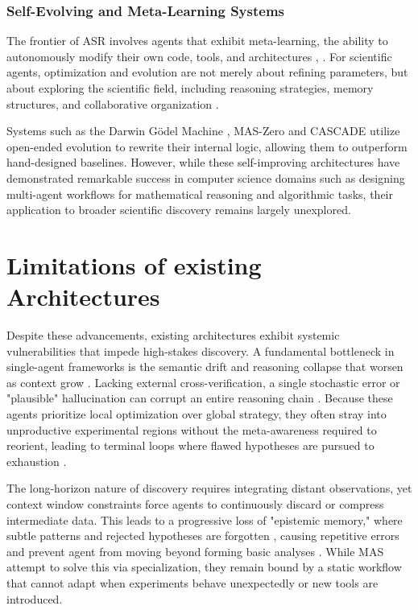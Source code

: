 \documentclass{article}
\begin{document}
\subsubsection{Self-Evolving and Meta-Learning Systems}


The frontier of ASR involves agents that exhibit meta-learning, the ability to autonomously modify their own code, tools, and architectures \cite{23_hu_automated_2025}, \cite{26_sheng_self-programming_2023}.  For scientific agents, optimization and evolution are not merely about refining parameters, but about exploring the scientific field, including reasoning strategies, memory structures, and collaborative organization \cite{zhou2025autonomousagentsscientificdiscovery}.

Systems such as the Darwin Gödel Machine \cite{22_zhang_darwin_2025}, MAS-Zero \cite{24_ke_mas-zero_2025} and CASCADE \cite{28_huang_cascade_2025} utilize open-ended evolution to rewrite their internal logic, allowing them to outperform hand-designed baselines.  However, while these self-improving architectures have demonstrated remarkable success in computer science domains such as designing multi-agent workflows for mathematical reasoning and algorithmic tasks, their application to broader scientific discovery remains largely unexplored.


\section{Limitations of existing Architectures}


Despite these advancements, existing architectures exhibit systemic vulnerabilities that impede high-stakes discovery. A fundamental bottleneck in single-agent frameworks is  the semantic drift and reasoning collapse that worsen as context grow \cite{du2025contextlengthhurtsllm}. Lacking external cross-verification, a single stochastic error or "plausible" hallucination can corrupt an entire reasoning chain \cite{13_huang_mlagentbench_2024}. Because these agents prioritize local optimization over global strategy, they often stray into unproductive experimental regions without the meta-awareness required to reorient, leading to terminal loops where flawed hypotheses are pursued to exhaustion \cite{14_zhang_mlrc-bench_2025}.

 The long-horizon nature of discovery requires integrating distant observations, yet context window constraints force agents to continuously discard or compress intermediate data. This leads to a progressive loss of "epistemic memory," where subtle patterns and rejected hypotheses are forgotten \cite{30_zheng_lifelong_2026}, causing repetitive errors and prevent agent from moving beyond forming basic analyses \cite{10_gu_blade_2025}. While MAS attempt to solve this via specialization, they remain bound by a static workflow that cannot adapt when experiments behave unexpectedly or new tools are introduced.
\end{document}
